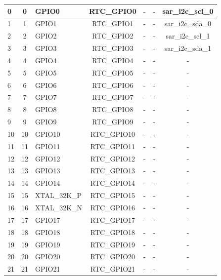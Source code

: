 \begin{ThreePartTable}
\begin{longtable}[c]{|p{2.3cm}|c|p{2.5cm}|c|c|c|c| }
0 & 0 & GPIO0   & RTC\_GPIO0       & -     & - &  sar\_i2c\_scl\_0\tnote{a}             \\
\hline
 1 & 1 & GPIO1   & RTC\_GPIO1       & -     & - &  sar\_i2c\_sda\_0\tnote{a}            \\
\hline
 2 & 2 & GPIO2   & RTC\_GPIO2       & -     & - &  sar\_i2c\_scl\_1\tnote{a}            \\
\hline
 3 & 3 & GPIO3   & RTC\_GPIO3       & -     & - &  sar\_i2c\_sda\_1\tnote{a}             \\
\hline
 4 & 4 & GPIO4   & RTC\_GPIO4       & -     & - &  -              \\
\hline
 5 & 5 & GPIO5   & RTC\_GPIO5       & -     & - &  -              \\
\hline
 6 & 6 & GPIO6   & RTC\_GPIO6       & -     & - &  -              \\
\hline
 7 & 7 & GPIO7   & RTC\_GPIO7       & -     & - &  -              \\
\hline
 8 & 8 & GPIO8   & RTC\_GPIO8       & -     & - &  -        \\
\hline
 9 & 9 & GPIO9   & RTC\_GPIO9       & -     & - &  -        \\
\hline
10 &  10 & GPIO10   & RTC\_GPIO10       & -     & -  &  -        \\
\hline
11 &  11 & GPIO11   & RTC\_GPIO11       & -     & -  &  -        \\
\hline
12 &  12 & GPIO12   & RTC\_GPIO12       & -     & -  &  -        \\
\hline
13 & 13 & GPIO13   & RTC\_GPIO13       & -     & -  &  -         \\
\hline
14 & 14 & GPIO14   & RTC\_GPIO14       & -     & -  &  -         \\
\hline
15 & 15 &  XTAL\_32K\_P & RTC\_GPIO15           & -     & -  &  -         \\
\hline
16 & 16 & XTAL\_32K\_N & RTC\_GPIO16           &  -     & -  &  -         \\
\hline
17 & 17 & GPIO17 & RTC\_GPIO17           & -     & -  &  -         \\
\hline
18 & 18 & GPIO18 & RTC\_GPIO18           & -     & -  &  -         \\
\hline
19 & 19 & GPIO19 & RTC\_GPIO19           & -     & -  &  -         \\
\hline
20 & 20 & GPIO20 & RTC\_GPIO20           &  -    & -  &  -         \\
\hline
21 & 21 & GPIO21 & RTC\_GPIO21           &  -    & -  &  -         \\
\hline

\end{longtable}

\end{ThreePartTable}